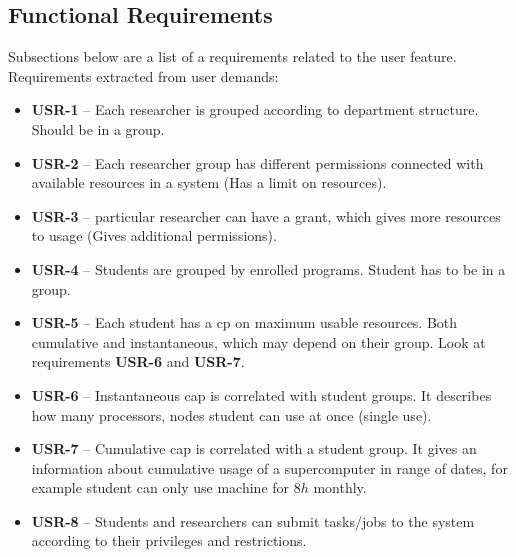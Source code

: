 \documentclass{report}
\begin{document}
\subsection{Functional Requirements}

Subsections below are a list of a requirements related to the user feature.
Requirements extracted from user demands:
\begin{itemize}
	\item
	{
		\textbf{USR-1} -- Each researcher is grouped according to department structure. Should be in a group.
	}
	\item
	{
		\textbf{USR-2} -- Each researcher group has different permissions connected with available resources in a system (Has a limit on resources).
	}
	\item
	{
		\textbf{USR-3} -- particular researcher can have a grant, which gives more resources to usage (Gives additional permissions).
	}
	\item
	{
		\textbf{USR-4} -- Students are grouped by enrolled programs. Student has to be in a group.
	}
	\item
	{
		\textbf{USR-5} -- Each student has a cp on maximum usable resources. Both cumulative and instantaneous, which may depend on their group. Look at requirements \textbf{USR-6} and \textbf{USR-7}.
	}
	\item
	{
		\textbf{USR-6} -- Instantaneous cap is correlated with student groups. It describes how many processors, nodes student can use at once (single use).
	}
	\item
	{
		\textbf{USR-7} -- Cumulative cap is correlated with a student group. It gives an information about cumulative usage of a supercomputer in range of dates, for example student can only use machine for $8h$ monthly.
	}
	\item
	{
		\textbf{USR-8} -- Students and researchers can submit tasks/jobs to the system according to their privileges and restrictions.
	}
\end{itemize}
\end{document}
